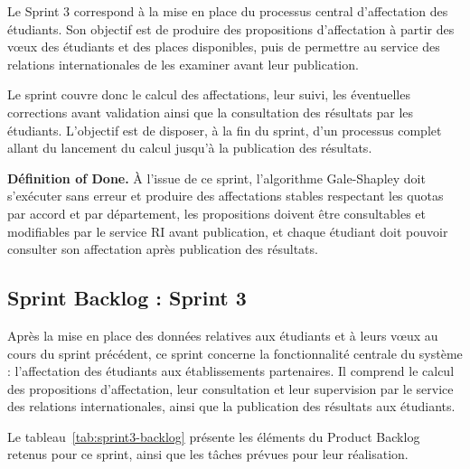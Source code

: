 Le Sprint 3 correspond à la mise en place du processus central d'affectation des étudiants. Son objectif est de produire des propositions d'affectation à partir des vœux des étudiants et des places disponibles, puis de permettre au service des relations internationales de les examiner avant leur publication.

Le sprint couvre donc le calcul des affectations, leur suivi, les éventuelles corrections avant validation ainsi que la consultation des résultats par les étudiants. L'objectif est de disposer, à la fin du sprint, d'un processus complet allant du lancement du calcul jusqu'à la publication des résultats.

\textbf{Définition of Done.} À l'issue de ce sprint, l'algorithme Gale-Shapley doit s'exécuter sans erreur et produire des affectations stables respectant les quotas par accord et par département, les propositions doivent être consultables et modifiables par le service RI avant publication, et chaque étudiant doit pouvoir consulter son affectation après publication des résultats.

\setcounter{tasknum}{1}

\newcommand{\usheaderorange}[2]{%
  \multicolumn{6}{|p{\uswidth}|}{%
    \cellcolor{orange!8}%
    \textbf{#1} : \small\textit{#2}%
  } \\ \hline
}

\subsection{Sprint Backlog : Sprint 3}

Après la mise en place des données relatives aux étudiants et à leurs vœux au cours du sprint précédent, ce sprint concerne la fonctionnalité centrale du système : l'affectation des étudiants aux établissements partenaires. Il comprend le calcul des propositions d'affectation, leur consultation et leur supervision par le service des relations internationales, ainsi que la publication des résultats aux étudiants.

Le tableau~\ref{tab:sprint3-backlog} présente les éléments du Product Backlog retenus pour ce sprint, ainsi que les tâches prévues pour leur réalisation.

\begingroup

\footnotesize

\setlength{\tabcolsep}{3pt}

\renewcommand{\arraystretch}{1.6}

